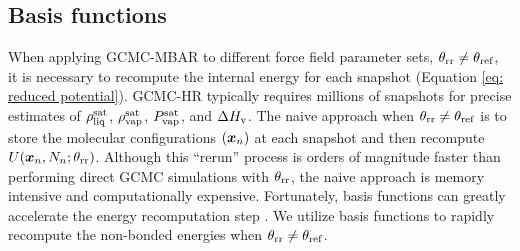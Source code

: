\documentclass[journal=jced,manuscript=article]{achemso}
\newcommand{\bfv}[1]{{\mbox{\boldmath{$#1$}}}}
\newcommand{\x}{\bfv{x}}
\begin{document}

\subsection{Basis functions} \label{sec: Basis functions}

When applying GCMC-MBAR to different force field parameter sets, $\theta_{\rm rr} \neq \theta_{\rm ref}$, it is necessary to recompute the internal energy for each snapshot (Equation \ref{eq: reduced potential}). GCMC-HR typically requires millions of snapshots for precise estimates of $\rho_{\rm liq}^{\rm sat}$, $\rho_{\rm vap}^{\rm sat}$, $P_{\rm vap}^{\rm sat}$, and $\Delta H_{\rm v}$. The naive approach when $\theta_{\rm rr} \neq \theta_{\rm ref}$ is to store the molecular configurations $(\x_{n})$ at each snapshot and then recompute $U(\x_{n},N_n;\theta_{\rm rr})$. Although this ``rerun'' process is orders of magnitude faster than performing direct GCMC simulations with $\theta_{\rm rr}$, the naive approach is memory intensive and computationally expensive. Fortunately, basis functions can greatly accelerate the energy recomputation step  \cite{naden:jctc:2016,Postdoc_1}. We utilize basis functions to rapidly recompute the non-bonded energies when $\theta_{\rm rr} \neq \theta_{\rm ref}$.
\end{document}
